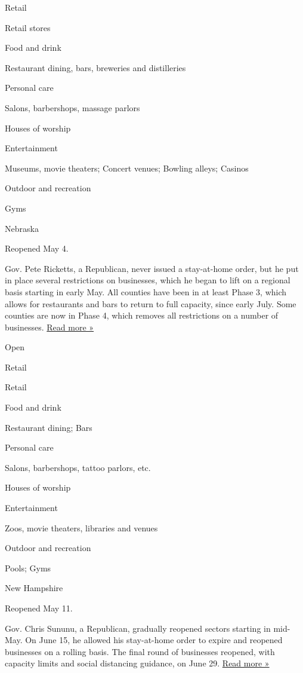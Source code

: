Retail

Retail stores

Food and drink

Restaurant dining, bars, breweries and distilleries

Personal care

Salons, barbershops, massage parlors

Houses of worship

Entertainment

Museums, movie theaters; Concert venues; Bowling alleys; Casinos

Outdoor and recreation

Gyms

Nebraska

Reopened May 4.

Gov. Pete Ricketts, a Republican, never issued a stay-at-home order, but
he put in place several restrictions on businesses, which he began to
lift on a regional basis starting in early May. All counties have been
in at least Phase 3, which allows for restaurants and bars to return to
full capacity, since early July. Some counties are now in Phase 4, which
removes all restrictions on a number of businesses.
\href{https://journalstar.com/lifestyles/health-med-fit/health/covid-19-restrictions-eased-in-more-nebraska-counties/article_a548e328-3c36-5dd2-8704-720256692fb3.html}{Read
more »}

Open

Retail

Retail

Food and drink

Restaurant dining; Bars

Personal care

Salons, barbershops, tattoo parlors, etc.

Houses of worship

Entertainment

Zoos, movie theaters, libraries and venues

Outdoor and recreation

Pools; Gyms

New Hampshire

Reopened May 11.

Gov. Chris Sununu, a Republican, gradually reopened sectors starting in
mid-May. On June 15, he allowed his stay-at-home order to expire and
reopened businesses on a rolling basis. The final round of businesses
reopened, with capacity limits and social distancing guidance, on June
29.
\href{https://www.unionleader.com/news/health/coronavirus/all-nh-businesses-now-have-date-to-reopen/article_558bfac2-5c67-5163-9fa3-7d7fcb426d9f.html}{Read
more »}

